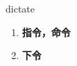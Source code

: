 
\begin{frame}
{\huge dictate}
\begin{center}
\begin{enumerate}\Large
  \item \textbf{指令，命令}
  \item \textbf{下令}
\end{enumerate}
\end{center}
\end{frame}
